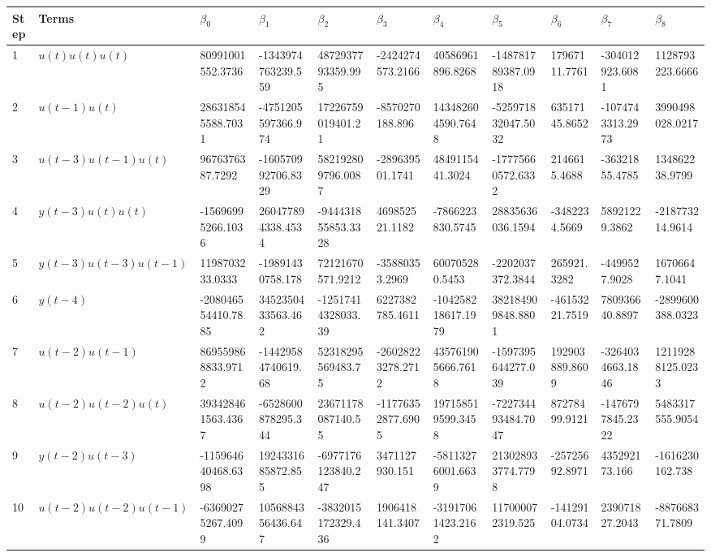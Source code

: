 \begin{tabular}{lllllllllll}
Step & Terms & $\beta_{0}$ & $\beta_{1}$ & $\beta_{2}$ & $\beta_{3}$ & $\beta_{4}$ & $\beta_{5}$ & $\beta_{6}$ & $\beta_{7}$ & $\beta_{8}$ \\ 
\hline 
1 & $u(t)u(t)u(t)$ & 80991001552.3736 & -1343974763239.559 & 4872937793359.995 & -2424274573.2166 & 40586961896.8268 & -148781789387.0918 & 17967111.7761 & -304012923.6081 & 1128793223.6666 \\ 
2 & $u(t-1)u(t)$ & 286318545588.7031 & -4751205597366.974 & 17226759019401.21 & -8570270188.896 & 143482604590.7648 & -525971832047.5032 & 63517145.8652 & -1074743313.2973 & 3990498028.0217 \\ 
3 & $u(t-3)u(t-1)u(t)$ & 9676376387.7292 & -160570992706.8329 & 582192809796.0087 & -289639501.1741 & 4849115441.3024 & -17775660572.6332 & 2146615.4688 & -36321855.4785 & 134862238.9799 \\ 
4 & $y(t-3)u(t)u(t)$ & -15696995266.1036 & 260477894338.4534 & -944431855853.3328 & 469852521.1182 & -7866223830.5745 & 28835636036.1594 & -3482234.5669 & 58921229.3862 & -218773214.9614 \\ 
5 & $y(t-3)u(t-3)u(t-1)$ & 1198703233.0333 & -19891430758.178 & 72121670571.9212 & -35880353.2969 & 600705280.5453 & -2202037372.3844 & 265921.3282 & -4499527.9028 & 16706647.1041 \\ 
6 & $y(t-4)$ & -208046554410.7885 & 3452350433563.462 & -12517414328033.39 & 6227382785.4611 & -104258218617.1979 & 382184909848.8801 & -46153221.7519 & 780936640.8897 & -2899600388.0323 \\ 
7 & $u(t-2)u(t-1)$ & 869559868833.9712 & -14429584740619.68 & 52318295569483.75 & -26028223278.2712 & 435761905666.7618 & -1597395644277.039 & 192903889.8609 & -3264034663.1846 & 12119288125.0233 \\ 
8 & $u(t-2)u(t-2)u(t)$ & 393428461563.4367 & -6528600878295.344 & 23671178087140.55 & -11776352877.6905 & 197158519599.3458 & -722734493484.7047 & 87278499.9121 & -1476797845.2322 & 5483317555.9054 \\ 
9 & $y(t-2)u(t-3)$ & -115964640468.6398 & 1924331685872.855 & -6977176123840.247 & 3471127930.151 & -58113276001.6639 & 213028933774.7798 & -25725692.8971 & 435292173.166 & -1616230162.738 \\ 
10 & $u(t-2)u(t-2)u(t-1)$ & -63690275267.4099 & 1056884356436.647 & -3832015172329.436 & 1906418141.3407 & -31917061423.2162 & 117000072319.525 & -14129104.0734 & 239071827.2043 & -887668371.7809 \\ 

\end{tabular}
